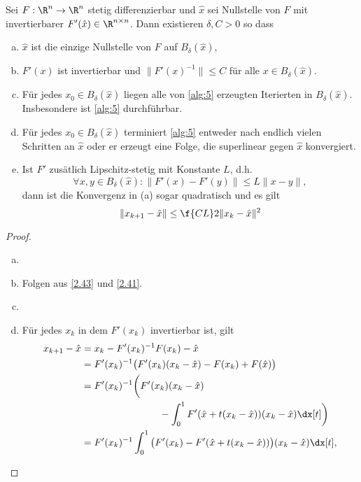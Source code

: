 
\begin{st} \label{2.46}
	Sei $F: \R^n \to \R^n$ stetig differenzierbar und $\hat x$ sei Nullstelle von $F$ mit invertierbarer $F'(\hat x) \in \R^{n\times n}$.
	Dann existieren $\delta, C > 0$ so dass
	\begin{enumerate}[(a)]
		\item
			$\hat x$ ist die einzige Nullstelle von $F$ auf $B_\delta(\hat x)$,
		\item
			$F'(x)$ ist invertierbar und $\|F'(x)^{-1}\| \le C$ für alle $x \in B_\delta(\hat x)$.
		\item
			Für jedes $x_0 \in B_\delta(\hat x)$ liegen alle von \ref{alg:5} erzeugten Iterierten in $B_\delta(\hat x)$.
			Insbesondere ist \ref{alg:5} durchführbar.
		\item
			Für jedes $x_0 \in B_\delta(\hat x)$ terminiert \ref{alg:5} entweder nach endlich vielen Schritten an $\hat x$ oder er erzeugt eine Folge, die superlinear gegen $\hat x$ konvergiert.
		\item
			Ist $F'$ zusätlich Lipschitz-stetig mit Konstante $L$, d.h.
			\[
				\forall x,y \in B_\delta(\hat x) : \|F'(x) - F'(y)\| \le L \|x-y\|,
			\]
			dann ist die Konvergenz in (a) sogar quadratisch und es gilt
			\[
				\|x_{k+1} - \hat x \| \le \f {CL}2 \|x_k - \hat x\|^2
			\]
	\end{enumerate}
	\begin{proof}
		\begin{enumerate}[(a)]
			\item
			\item
				Folgen aus \ref{2.43} und \ref{2.41}.
			\item
			\item
				Für jedes $x_k$ in dem $F'(x_k)$ invertierbar ist, gilt
				\begin{align*}
					x_{k+1} - \hat x
					&= x_k - F'(x_k)^{-1}F(x_k) - \hat x \\
					&= F'(x_k)^{-1}\big( F'(x_k) (x_k-\hat x) - F(x_k) + F(\hat x) \big) \\
					&= F'(x_k)^{-1}\bigg( F'(x_k) (x_k-\hat x) \\
					& \qquad\qquad\qquad\qquad - \int_0^1 F'(\hat x + t(x_k-\hat x))(x_k - \hat x) \dx[t] \bigg) \\
					&=F'(x_k)^{-1}\int_0^1 \big( F'(x_k) - F'(\hat x + t(x_k - \hat x)) \big)(x_k - \hat x) \dx[t],
				\end{align*}

\end{enumerate}
\end{proof}
\end{st}
